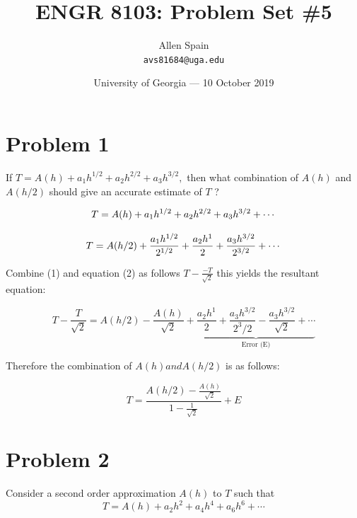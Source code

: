 \documentclass{article}
\title{ENGR 8103: Problem Set \#5} %
\author{Allen Spain\\ \texttt{avs81684@uga.edu}} %
\date{University of Georgia --- 10 October 2019 } %
\begin{document}
\maketitle %



\section*{Problem 1} %
If $T = A(h) + a_{1} h^{1/2} + a_{2} h^{2/2} + a_{3} h^{3/2},$ then what combination of $A(h)$ and $A(h/2)$ should give an accurate estimate of $T$ ?

\begin{equation}
T = A(h) + a_{1}h^{1/2} + a_{2}h^{2/2} + a_{3}h^{3/2}  + \cdots\\
\end{equation}

\begin{equation}
T = A(h/2) + \frac{a_{1}h^{1/2}}{2^{1/2}} + \frac{a_{2}h^{1}}{2} +\\ \frac{a_{3}h^{3/2}}{2^{3/2}} + \cdots
\end{equation}

Combine (1) and equation (2) as follows $T - \frac{-T}{\sqrt{2}} $ this yields the resultant equation:

\begin{equation}
T - \frac{T}{\sqrt{2}} =  A(h/2) - \frac{A(h)}{\sqrt{2}} + \underbrace{ \frac{a_{2}h^{1}}{2} + \frac{a_{3}h^{3/2}}{2^3/2} - \frac{a_{3}h^{3/2}}{\sqrt{2}} + \cdots}_\text{Error (E)}
\end{equation}

Therefore the combination of $A(h) and A(h/2)$ is as follows:

\begin{equation}
T = \frac{A(h/2) - \frac{A(h)}{\sqrt{2}}}{1-\frac{1}{\sqrt{2}}} + E
\end{equation}



\section*{Problem 2} %
Consider a second order approximation $A(h)$ to $T$ such that
\begin{equation}
T = A(h) + a_{2}h^{2} + a_{4}h^{4} + a_{6}h^{6} + \cdots
\end{equation}
\end{document}
